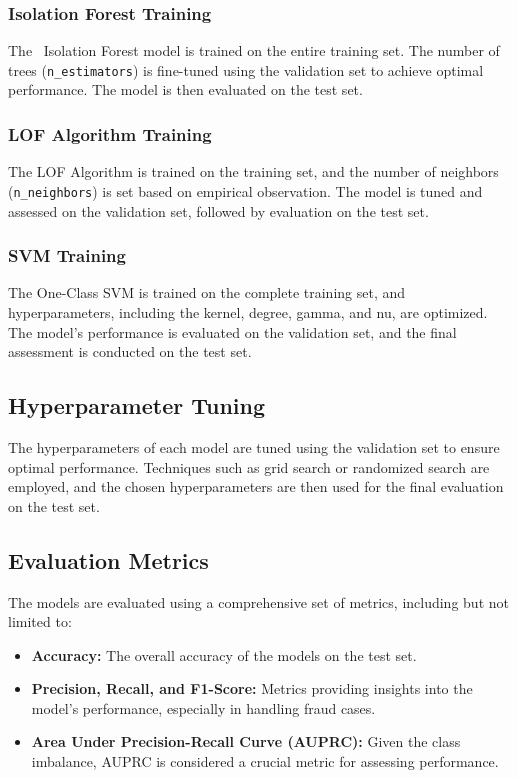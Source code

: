 \documentclass[journal]{IEEEtran}
\begin{document}
\subsubsection{Isolation Forest Training}

The ~Isolation Forest model is trained on the entire training set. The number of trees (\texttt{n\_estimators}) is fine-tuned using the validation set to achieve optimal performance. The model is then evaluated on the test set.

\subsubsection{LOF Algorithm Training}

The LOF Algorithm is trained on the training set, and the number of neighbors (\texttt{n\_neighbors}) is set based on empirical observation. The model is tuned and assessed on the validation set, followed by evaluation on the test set.

\subsubsection{SVM Training}

The One-Class SVM is trained on the complete training set, and hyperparameters, including the kernel, degree, gamma, and nu, are optimized. The model's performance is evaluated on the validation set, and the final assessment is conducted on the test set.

\subsection{Hyperparameter Tuning}

The hyperparameters of each model are tuned using the validation set to ensure optimal performance. Techniques such as grid search or randomized search are employed, and the chosen hyperparameters are then used for the final evaluation on the test set.

\subsection{Evaluation Metrics}

The models are evaluated using a comprehensive set of metrics, including but not limited to:

\begin{itemize}
    \item \textbf{Accuracy:} The overall accuracy of the models on the test set.
    \item \textbf{Precision, Recall, and F1-Score:} Metrics providing insights into the model's performance, especially in handling fraud cases.
    \item \textbf{Area Under Precision-Recall Curve (AUPRC):} Given the class imbalance, AUPRC is considered a crucial metric for assessing performance.
\end{itemize}
\end{document}
